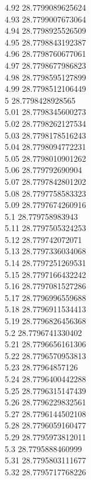 {4.92	28.7799089625624\\
4.93	28.7799007673064\\
4.94	28.7798925526509\\
4.95	28.7798843192387\\
4.96	28.7798760677061\\
4.97	28.7798677986823\\
4.98	28.7798595127899\\
4.99	28.7798512106449\\
5	28.7798428928565\\
5.01	28.7798345600273\\
5.02	28.7798262127534\\
5.03	28.7798178516243\\
5.04	28.7798094772231\\
5.05	28.7798010901262\\
5.06	28.779792690904\\
5.07	28.7797842801202\\
5.08	28.7797758583323\\
5.09	28.7797674260916\\
5.1	28.779758983943\\
5.11	28.7797505324253\\
5.12	28.779742072071\\
5.13	28.7797336034068\\
5.14	28.7797251269531\\
5.15	28.7797166432242\\
5.16	28.7797081527286\\
5.17	28.7796996559688\\
5.18	28.7796911534413\\
5.19	28.7796826456368\\
5.2	28.7796741330402\\
5.21	28.7796656161306\\
5.22	28.7796570953813\\
5.23	28.77964857126\\
5.24	28.7796400442288\\
5.25	28.7796315147439\\
5.26	28.7796229832561\\
5.27	28.7796144502108\\
5.28	28.7796059160477\\
5.29	28.7795973812011\\
5.3	28.7795888460999\\
5.31	28.7795803111677\\
5.32	28.7795717768226\\
}
